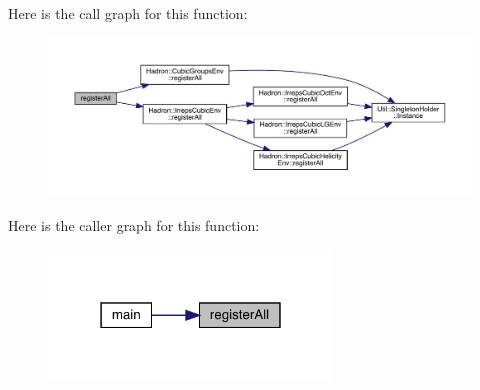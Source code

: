 Here is the call graph for this function\+:
\nopagebreak
\begin{figure}[H]
\begin{center}
\leavevmode
\includegraphics[width=350pt]{d1/d65/adat-devel_2main_2irreputils_2num__embed__table_8cc_a3872416cf70cb24d7da1008a3f3b1d96_cgraph}
\end{center}
\end{figure}
Here is the caller graph for this function\+:
\nopagebreak
\begin{figure}[H]
\begin{center}
\leavevmode
\includegraphics[width=214pt]{d1/d65/adat-devel_2main_2irreputils_2num__embed__table_8cc_a3872416cf70cb24d7da1008a3f3b1d96_icgraph}
\end{center}
\end{figure}
